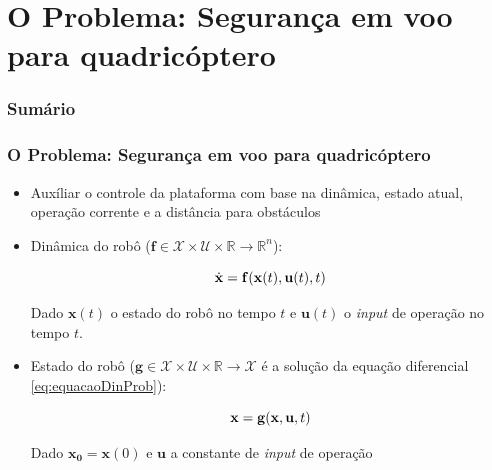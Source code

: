 \documentclass{beamer}
\begin{document}
\section{O Problema: Segurança em voo para quadricóptero}

\begin{frame}
	\frametitle{Sumário}
	\tableofcontents[currentsection]
\end{frame}

\begin{frame}[allowframebreaks]
	\frametitle{O Problema: Segurança em voo para quadricóptero}
	
	\begin{itemize}
		
		\item Auxíliar o controle da plataforma com base na dinâmica, estado  atual, operação corrente e a distância para obstáculos
		
		\item Dinâmica do robô ($\mathbf{f} \in \mathcal{X} \times \mathcal{U} \times \mathbb{R} \rightarrow \mathbb{R}^{n}$):
		
		\begin{equation}
		\centering
		\dot{\mathbf{x}} = \mathbf{f}(\mathbf{x}(t),\mathbf{u}(t),t)  
		\label{eq:equacaoDinProb}
		\end{equation}
		
		
		Dado $\mathbf{x}(t)$ o estado do robô no tempo $t$ e $\mathbf{u}(t)$ o \textit{input} de operação no tempo $t$.
		
		
		
		\item Estado do robô ($\mathbf{g} \in \mathcal{X} \times \mathcal{U} \times \mathbb{R} \rightarrow \mathcal{X}$ é a solução da equação diferencial \ref{eq:equacaoDinProb}):
		
		\begin{equation}
		\centering
		\mathbf{x} = \mathbf{g}(\mathbf{x},\mathbf{u},t)  
		\label{eq:equacaoPosProb}
		\end{equation}
	
		Dado $\mathbf{x_0} = \mathbf{x}(0)$ e $\mathbf{u}$ a constante de \textit{input} de operação				
		
	\framebreak
	
		

\end{itemize}
\end{frame}
\end{document}
